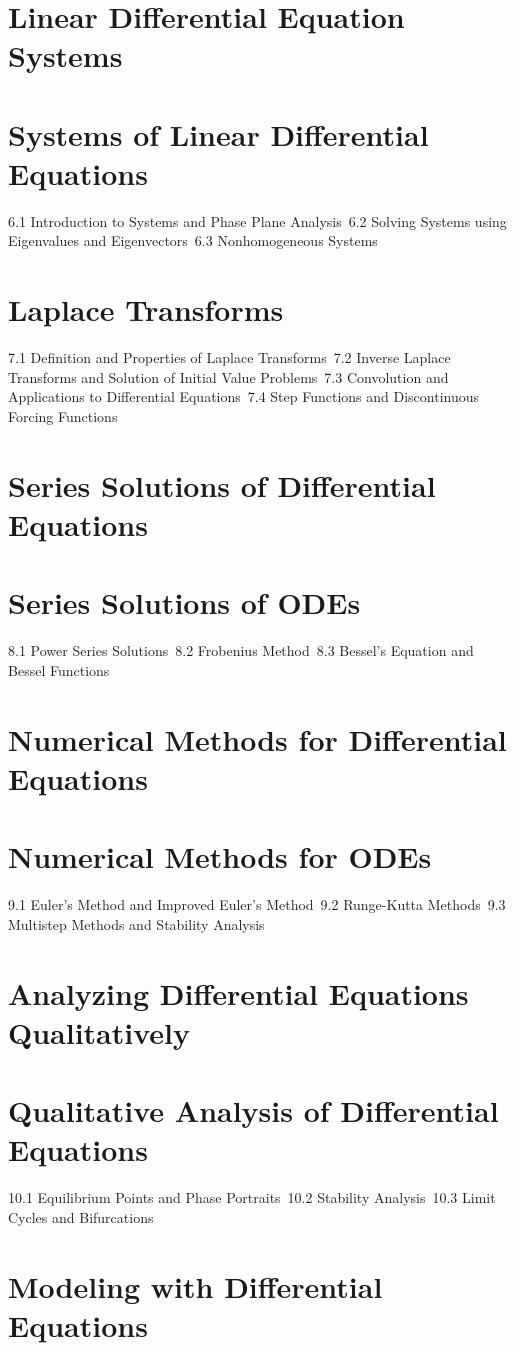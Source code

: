 \section{Linear Differential Equation Systems}
\section{Systems of Linear Differential Equations}
6.1 Introduction to Systems and Phase Plane Analysis\
6.2 Solving Systems using Eigenvalues and Eigenvectors\
6.3 Nonhomogeneous Systems\
\section{Laplace Transforms}
7.1 Definition and Properties of Laplace Transforms\
7.2 Inverse Laplace Transforms and Solution of Initial Value Problems\
7.3 Convolution and Applications to Differential Equations\
7.4 Step Functions and Discontinuous Forcing Functions\
\section{Series Solutions of Differential Equations}
\section{Series Solutions of ODEs}
8.1 Power Series Solutions\
8.2 Frobenius Method\
8.3 Bessel's Equation and Bessel Functions\
\section{Numerical Methods for Differential Equations}
\section{Numerical Methods for ODEs}
9.1 Euler's Method and Improved Euler's Method\
9.2 Runge-Kutta Methods\
9.3 Multistep Methods and Stability Analysis\
\section{Analyzing Differential Equations Qualitatively}
\section{Qualitative Analysis of Differential Equations}
10.1 Equilibrium Points and Phase Portraits\
10.2 Stability Analysis\
10.3 Limit Cycles and Bifurcations\
\section{Modeling with Differential Equations}
